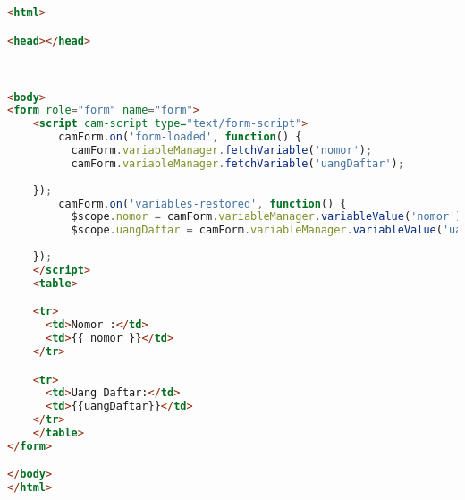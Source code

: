 \begin{lstlisting}[language=html,basicstyle=\tiny,caption=ringkasa-pembayaran.html]
<html>

<head></head>


	
<body>
<form role="form" name="form">
	<script cam-script type="text/form-script">
    	camForm.on('form-loaded', function() {
	      camForm.variableManager.fetchVariable('nomor');
	      camForm.variableManager.fetchVariable('uangDaftar');
	      
    });
    	camForm.on('variables-restored', function() {
	      $scope.nomor = camForm.variableManager.variableValue('nomor');
	      $scope.uangDaftar = camForm.variableManager.variableValue('uangDaftar');
	      
    });
  	</script>
  	<table>

    <tr>
      <td>Nomor :</td>
      <td>{{ nomor }}</td>
    </tr>

    <tr>
      <td>Uang Daftar:</td>
      <td>{{uangDaftar}}</td>
    </tr>
    </table>
</form> 

</body>
</html>
\end{lstlisting}

